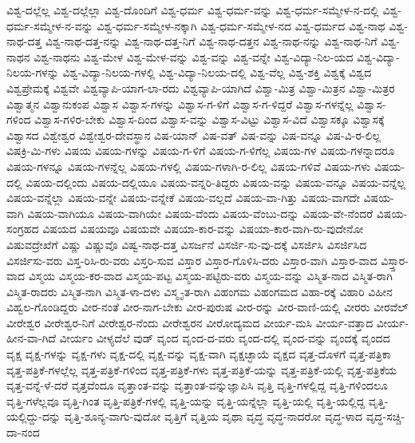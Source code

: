 {ವಿಶ್ವ-ದಲ್ಲೆಲ್ಲ
ವಿಶ್ವ-ದಲ್ಲೆಲ್ಲಾ
ವಿಶ್ವ-ದೊಂದಿಗೆ
ವಿಶ್ವ-ಧರ್ಮ
ವಿಶ್ವ-ಧರ್ಮ-ವನ್ನು
ವಿಶ್ವ-ಧರ್ಮ-ಸಮ್ಮೇಳ-ನ-ದಲ್ಲಿ
ವಿಶ್ವ-ಧರ್ಮ-ಸಮ್ಮೇಳ-ನ-ವನ್ನು
ವಿಶ್ವ-ಧರ್ಮ-ಸಮ್ಮೇಳ-ನಕ್ಕಾಗಿ
ವಿಶ್ವ-ಧರ್ಮ-ಸಮ್ಮೇಳ-ನದ
ವಿಶ್ವ-ಧರ್ಮದ
ವಿಶ್ವ-ನಾಥ
ವಿಶ್ವ-ನಾಥ-ದತ್ತ
ವಿಶ್ವ-ನಾಥ-ದತ್ತ-ನನ್ನು
ವಿಶ್ವ-ನಾಥ-ದತ್ತ-ನಿಗೆ
ವಿಶ್ವ-ನಾಥ-ದತ್ತನ
ವಿಶ್ವ-ನಾಥ-ನನ್ನು
ವಿಶ್ವ-ನಾಥ-ನಿಗೆ
ವಿಶ್ವ-ನಾಥನ
ವಿಶ್ವ-ನಾಥನು
ವಿಶ್ವ-ಮೇಳ
ವಿಶ್ವ-ಮೇಳ-ವನ್ನು
ವಿಶ್ವ-ವನ್ನು
ವಿಶ್ವ-ವನ್ನೇ
ವಿಶ್ವ-ವಿದ್ಯಾ-ನಿಲ-ಯದ
ವಿಶ್ವ-ವಿದ್ಯಾ-ನಿಲಯ-ಗಳನ್ನು
ವಿಶ್ವ-ವಿದ್ಯಾ-ನಿಲಯ-ಗಳಲ್ಲಿ
ವಿಶ್ವ-ವಿದ್ಯಾ-ನಿಲಯ-ದಲ್ಲಿ
ವಿಶ್ವ-ವೆಲ್ಲ
ವಿಶ್ವ-ಶಕ್ತಿ
ವಿಶ್ವಕ್ಕೆ
ವಿಶ್ವದ
ವಿಶ್ವಪ್ರೇಮಕ್ಕೆ
ವಿಶ್ವವೇ
ವಿಶ್ವವ್ಯಾಪಿ-ಯಾಗ-ಲಾ-ರದು
ವಿಶ್ವವ್ಯಾಪಿ-ಯಾಗಿದೆ
ವಿಶ್ವಾ-ಮಿತ್ರ
ವಿಶ್ವಾ-ಮಿತ್ರನ
ವಿಶ್ವಾ-ಮಿತ್ರರ
ವಿಶ್ವಾತ್ಮನ
ವಿಶ್ವಾನುಕಂಪ
ವಿಶ್ವಾಸ
ವಿಶ್ವಾಸ-ಗಳನ್ನು
ವಿಶ್ವಾಸ-ಗ-ಳಿಗೆ
ವಿಶ್ವಾಸ-ಗ-ಳಿದ್ದರೆ
ವಿಶ್ವಾಸ-ಗಳನ್ನೆಲ್ಲ
ವಿಶ್ವಾಸ-ಗಳಿಂದ
ವಿಶ್ವಾಸ-ಗಳಿರ-ಬೇಕು
ವಿಶ್ವಾಸ-ದಿಂದ
ವಿಶ್ವಾಸ-ವನ್ನು
ವಿಶ್ವಾಸ-ವಿಟ್ಟು
ವಿಶ್ವಾಸ-ವಿದೆ
ವಿಶ್ವಾಸಕ್ಕೂ
ವಿಶ್ವಾಸಕ್ಕೆ
ವಿಶ್ವಾಸದ
ವಿಶ್ವೇಶ್ವರ
ವಿಶ್ವೇಶ್ವರ-ದೇವಸ್ಥಾನ
ವಿಷ-ಯಾನ್
ವಿಷ-ವತ್
ವಿಷ-ವನ್ನು
ವಿಷ-ವನ್ನೂ
ವಿಷ-ವಿ-ರ-ಲಿಲ್ಲ
ವಿಷಕ್ರಿ-ಮಿ-ಗಳು
ವಿಷಯ
ವಿಷಯ-ಗಳನ್ನು
ವಿಷಯ-ಗ-ಳಿಗೆ
ವಿಷಯ-ಗ-ಳಿಗೆಲ್ಲ
ವಿಷಯ-ಗಳ
ವಿಷಯ-ಗಳನ್ನಾದರೂ
ವಿಷಯ-ಗಳನ್ನೂ
ವಿಷಯ-ಗಳನ್ನೆಲ್ಲ
ವಿಷಯ-ಗಳಲ್ಲಿ
ವಿಷಯ-ಗಳಾಗಿ-ರ-ಲಿಲ್ಲ
ವಿಷಯ-ಗಳಿವೆ
ವಿಷಯ-ಗಳು
ವಿಷಯ-ದಲ್ಲಿ
ವಿಷಯ-ದಲ್ಲಿಂದು
ವಿಷಯ-ದಲ್ಲಿಯೂ
ವಿಷಯ-ವನ್ನರಿ-ತಿದ್ದರು
ವಿಷಯ-ವನ್ನು
ವಿಷಯ-ವನ್ನೂ
ವಿಷಯ-ವನ್ನೆಲ್ಲ
ವಿಷಯ-ವನ್ನೆಲ್ಲಾ
ವಿಷಯ-ವನ್ನೇ
ವಿಷಯ-ವನ್ನೇಕೆ
ವಿಷಯ-ವಲ್ಲದೆ
ವಿಷಯ-ವಾ-ಗಿತ್ತು
ವಿಷಯ-ವಾಗದೇ
ವಿಷಯ-ವಾಗಿ
ವಿಷಯ-ವಾಗಿಯೂ
ವಿಷಯ-ವಾಗಿಯೇ
ವಿಷಯ-ವೆಂದು
ವಿಷಯ-ವೆಂಬು-ದನ್ನು
ವಿಷಯ-ವೇ-ನೆಂದರೆ
ವಿಷಯ-ಸಂಗ್ರಹದ
ವಿಷಯದ
ವಿಷಯವೂ
ವಿಷಯವೇ
ವಿಷಯಾ-ಕಾರ-ವನ್ನು
ವಿಷಯಾ-ಕಾರ-ವಾಗಿ-ರು-ವುದೇನೋ
ವಿಷುವದ್ರೇಖೆಗೆ
ವಿಷ್ಣು
ವಿಷ್ಣುವೊ
ವಿಷ್ವ-ನಾಥ-ದತ್ತ
ವಿಸರ್ಜನೆ
ವಿಸರ್ಜಿ-ಸು-ವು-ದಕ್ಕೆ
ವಿಸರ್ಜಿಸಿ
ವಿಸರ್ಜಿಸಿದ
ವಿಸರ್ಜಿಸು-ವರು
ವಿಸ್ತ-ರಿಸಿ-ರು-ವರು
ವಿಸ್ತರಿ-ಸುವ
ವಿಸ್ತಾರ
ವಿಸ್ತಾರ-ಗೊಳಿಸಿ-ದರು
ವಿಸ್ತಾರ-ವಾಗಿ
ವಿಸ್ತಾರ-ವಾದ
ವಿಸ್ತ್ತಾರ-ವಾದ
ವಿಸ್ಮಯ
ವಿಸ್ಮಯ-ಕರ-ವಾದ
ವಿಸ್ಮಯ-ಪಟ್ಟ
ವಿಸ್ಮಯ-ಪಟ್ಟಿರು-ವರು
ವಿಸ್ಮಯ-ವನ್ನು
ವಿಸ್ಮಿತ-ನಾದ
ವಿಸ್ಮಿತ-ರಾಗಿ
ವಿಸ್ಮಿತ-ರಾದರು
ವಿಸ್ಮಿತ-ನಾಗಿ
ವಿಸ್ಮಿತ-ಳಾ-ದಳು
ವಿಸ್ಮೃ-ತ-ರಾಗಿ
ವಿಹಂಗಮ
ವಿಹಂಗಮದ
ವಿಹಾ-ರಕ್ಕೆ
ವಿಹಾರಿ
ವಿಹೀನ
ವಿಹ್ವಲ-ಗೊಂಡಿದ್ದರು
ವೀರ-ನಂತೆ
ವೀರ-ನಾಗ-ಬೇಕು
ವೀರ-ಪುರುಷ
ವೀರ-ರನ್ನು
ವೀರ-ವಾಣಿ-ಯಲ್ಲಿ
ವೀರರು
ವೀರವೆಲ್
ವೀರೇಶ್ವರ
ವೀರೇಶ್ವರ-ನಿಗೆ
ವೀರೇಶ್ವರ-ನೆಂದು
ವೀರೇಶ್ವರನ
ವೀರೋದ್ಯಮದ
ವೀರ್ಯ-ಮಸಿ
ವೀರ್ಯ-ವತ್ತಾದ
ವೀರ್ಯ-ಹೀನ-ವಾ-ಗಿದೆ
ವೀರ್ಯಂ
ವೀಳ್ಯದೆಲೆ
ವುಡ್
ವೃಂದ
ವೃಂದ-ದ-ವರು
ವೃಂದ-ದಲ್ಲಿ
ವೃಂದ-ವನ್ನು
ವೃಂದಕ್ಕೆ
ವೃಂದದ
ವೃಕ್ಷ
ವೃಕ್ಷ-ಗಳನ್ನು
ವೃಕ್ಷ-ಗಳು
ವೃಕ್ಷ-ದಲ್ಲಿ
ವೃಕ್ಷ-ವನ್ನು
ವೃಕ್ಷ-ವಾಗಿ
ವೃಕ್ಷಚ್ಛಾಯೆ
ವೃಕ್ಷದ
ವೃತ್ತ-ದೊಳಗೆ
ವೃತ್ತ-ಪತ್ರಿಕಾ
ವೃತ್ತ-ಪತ್ರಿಕೆ-ಗಳಲ್ಲೆಲ್ಲ
ವೃತ್ತ-ಪತ್ರಿಕೆ-ಗಳಿಂದ
ವೃತ್ತ-ಪತ್ರಿಕೆ-ಗಳು
ವೃತ್ತ-ಪತ್ರಿಕೆ-ಯನ್ನು
ವೃತ್ತ-ಪತ್ರಿಕೆ-ಯಲ್ಲಿ
ವೃತ್ತ-ಪತ್ರಿಕೆಯ
ವೃತ್ತ-ವನ್ನೆ-ಳೆ-ದರೆ
ವೃತ್ತವೆಂದೂ
ವೃತ್ತಾಂತ-ವನ್ನು
ವೃತ್ತಾಂತ-ವನ್ನುಜ್ಞಾಪಿಸಿ
ವೃತ್ತಿ
ವೃತ್ತಿ-ಗಳಲ್ಲಿದ್ದ
ವೃತ್ತಿ-ಗಳಿಂದಲೂ
ವೃತ್ತಿ-ಗಳೆಲ್ಲವೂ
ವೃತ್ತಿ-ಗಿಂತ
ವೃತ್ತಿ-ಪತ್ರಿಕೆ-ಗಳಲ್ಲಿ
ವೃತ್ತಿ-ಯನ್ನು
ವೃತ್ತಿ-ಯನ್ನೆಲ್ಲಾ
ವೃತ್ತಿ-ಯಲ್ಲಿ
ವೃತ್ತಿ-ಯಲ್ಲಿದ್ದ
ವೃತ್ತಿ-ಯಲ್ಲಿದ್ದು-ದನ್ನು
ವೃತ್ತಿ-ಶೂನ್ಯ-ವಾಗು-ವುದೋ
ವೃತ್ತಿಗೆ
ವೃತ್ತಿಯ
ವೃಥಾ
ವೃದ್ಧ
ವೃದ್ಧ-ನಾದರೋ
ವೃದ್ಧ-ಳಾದ
ವೃದ್ಧ-ಸಚ್ಚಿ-ದಾ-ನಂದ
}
